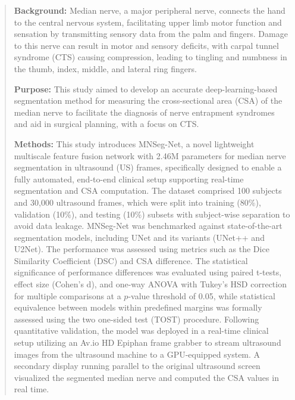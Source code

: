 \newpage
\begin{abstract}  
\noindent \textbf{Background:} Median nerve, a major peripheral nerve, connects the hand to the central nervous system, facilitating upper limb motor function and sensation by transmitting sensory data from the palm and fingers. Damage to this nerve can result in motor and sensory deficits, with carpal tunnel syndrome (CTS) causing compression, leading to tingling and numbness in the thumb, index, middle, and lateral ring fingers.

\noindent \textbf{Purpose:}  This study aimed to develop an accurate deep-learning-based segmentation method for measuring the cross-sectional area (CSA) of the median nerve to facilitate the diagnosis of nerve entrapment syndromes and aid in surgical planning, with a focus on CTS.


\noindent \textbf{Methods:} This study introduces MNSeg-Net, a novel lightweight multiscale feature fusion network with 2.46M parameters for median nerve segmentation in ultrasound (US) frames, specifically designed to enable a fully automated, end-to-end clinical setup supporting real-time segmentation and CSA computation. The dataset comprised 100 subjects and 30,000 ultrasound frames, which were split into training (80\%), validation (10\%), and testing (10\%) subsets with subject-wise separation to avoid data leakage. MNSeg-Net was benchmarked against state-of-the-art segmentation models, including UNet and its variants (UNet++ and U2Net). The performance was assessed using metrics such as the Dice Similarity Coefficient (DSC) and CSA difference. The statistical significance of performance differences was evaluated using paired t-tests, effect size (Cohen’s d), and one-way ANOVA with Tukey’s HSD correction for multiple comparisons at a $p$-value threshold of 0.05, while statistical equivalence between models within predefined margins was formally assessed using the two one-sided test (TOST) procedure. Following quantitative validation, the model was deployed in a real-time clinical setup utilizing an Av.io HD Epiphan frame grabber to stream ultrasound images from the ultrasound machine to a GPU-equipped system. A secondary display running parallel to the original ultrasound screen visualized the segmented median nerve and computed the CSA values in real time.



\end{abstract}

